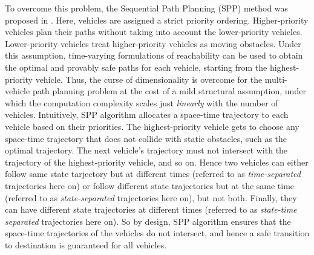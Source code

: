 To overcome this problem, the Sequential Path Planning (SPP) method was proposed in \cite{Chen15c}. Here, vehicles are assigned a strict priority ordering. Higher-priority vehicles plan their paths without taking into account the lower-priority vehicles. Lower-priority vehicles treat higher-priority vehicles as moving obstacles. Under this assumption, time-varying formulations of reachability \cite{Bokanowski11, Fisac15} can be used to obtain the optimal and provably safe paths for each vehicle, starting from the highest-priority vehicle. Thus, the curse of dimensionality is overcome for the multi-vehicle path planning problem at the cost of a mild structural assumption, under which the computation complexity scales just \textit{linearly} with the number of vehicles. Intuitively, SPP algorithm allocates a space-time trajectory to each vehicle based on their priorities. The highest-priority vehicle gets to choose any space-time trajectory that does not collide with static obstacles, such as the optimal trajectory. The next vehicle's trajectory must not intersect with the trajectory of the highest-priority vehicle, and so on. Hence two vehicles can either follow same state tarjectory but at different times (referred to as \textit{time-separated} trajectories here on) or follow different state trajectories but at the same time (referred to as \textit{state-separated} trajectories here on), but not both. Finally, they can have different state trajectories at different times (referred to as \textit{state-time separated} trajectories here on). So by design, SPP algorithm ensures that the space-time trajectories of the vehicles do not intersect, and hence a safe transition to destination is guaranteed for all vehicles.  

